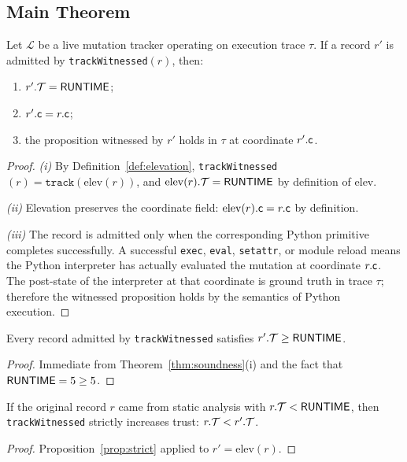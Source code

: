 \documentclass[11pt]{article}
\newcommand{\LiveTrack}{\mathcal{L}}             %
\newcommand{\elevate}{\mathrm{elev}}             %
\begin{document}
\subsection{Main Theorem}
\label{subsec:main-thm}

\begin{theorem}
\label{thm:soundness}
Let $\LiveTrack$ be a live mutation tracker operating on execution
trace $\tau$.  If a record $r'$ is admitted by
\texttt{trackWitnessed}$(r)$, then:
\begin{enumerate}[label=(\roman*)]
\item $r'.\mathcal{T} = \mathsf{RUNTIME}$;
\item $r'.\mathsf{c} = r.\mathsf{c}$;
\item the proposition witnessed by $r'$ holds in $\tau$ at
      coordinate $r'.\mathsf{c}$.
\end{enumerate}
\end{theorem}
\begin{proof}
\textit{(i)} By Definition~\ref{def:elevation},
\texttt{trackWitnessed}$(r) = \texttt{track}(\elevate(r))$, and
$\elevate(r).\trust = \Truntime$ by definition of $\elevate$.

\textit{(ii)} Elevation preserves the coordinate field:
$\elevate(r).\coord = r.\coord$ by definition.

\textit{(iii)} The record is admitted only when the corresponding
Python primitive completes successfully.  A successful
\texttt{exec}, \texttt{eval}, \texttt{setattr}, or module reload
means the Python interpreter has actually evaluated the mutation at
coordinate $r.\mathsf{c}$.  The post-state of the interpreter at that
coordinate is ground truth in trace $\tau$; therefore the witnessed
proposition holds by the semantics of Python execution.
\end{proof}

\begin{corollary}
\label{cor:live}
Every record admitted by \texttt{trackWitnessed} satisfies
$r'.\mathcal{T} \geq \mathsf{RUNTIME}$.
\end{corollary}
\begin{proof}
Immediate from Theorem~\ref{thm:soundness}(i) and the fact that
$\mathsf{RUNTIME} = 5 \geq 5$.
\end{proof}

\begin{corollary}
\label{cor:strict-elev}
If the original record $r$ came from static analysis with
$r.\mathcal{T} < \mathsf{RUNTIME}$, then \texttt{trackWitnessed} strictly
increases trust: $r.\mathcal{T} < r'.\mathcal{T}$.
\end{corollary}
\begin{proof}
Proposition~\ref{prop:strict} applied to $r' = \elevate(r)$.
\end{proof}
\end{document}

